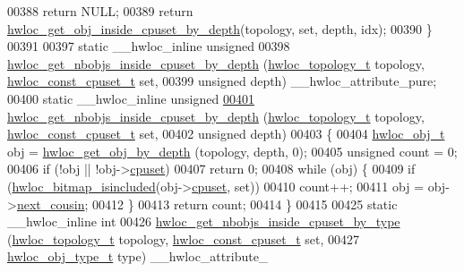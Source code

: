 \begin{DoxyCode}
00388     \textcolor{keywordflow}{return} NULL;
00389   \textcolor{keywordflow}{return} \hyperlink{a00054_ga57c8a0e227d1b16a31d19aaf755b42c0}{hwloc_get_obj_inside_cpuset_by_depth}(topology, \textcolor{keyword}{set}, depth, idx);
00390 \}
00391 
00397 \textcolor{keyword}{static} \_\_hwloc\_inline \textcolor{keywordtype}{unsigned}
00398 \hyperlink{a00054_ga457604a2dedbf70ba3b480558666b56b}{hwloc_get_nbobjs_inside_cpuset_by_depth} (\hyperlink{a00039_ga9d1e76ee15a7dee158b786c30b6a6e38}{hwloc_topology_t} topology, 
      \hyperlink{a00040_ga1f784433e9b606261f62d1134f6a3b25}{hwloc_const_cpuset_t} \textcolor{keyword}{set},
00399                                          \textcolor{keywordtype}{unsigned} depth) \_\_hwloc\_attribute\_pure;
00400 \textcolor{keyword}{static} \_\_hwloc\_inline \textcolor{keywordtype}{unsigned}
\hypertarget{a00031_source_l00401}{}\hyperlink{a00054_ga457604a2dedbf70ba3b480558666b56b}{00401} \hyperlink{a00054_ga457604a2dedbf70ba3b480558666b56b}{hwloc_get_nbobjs_inside_cpuset_by_depth} (\hyperlink{a00039_ga9d1e76ee15a7dee158b786c30b6a6e38}{hwloc_topology_t} topology, 
      \hyperlink{a00040_ga1f784433e9b606261f62d1134f6a3b25}{hwloc_const_cpuset_t} \textcolor{keyword}{set},
00402                                          \textcolor{keywordtype}{unsigned} depth)
00403 \{
00404   \hyperlink{a00016}{hwloc_obj_t} obj = \hyperlink{a00047_gaedd78240b0c1108355586a268ec5a697}{hwloc_get_obj_by_depth} (topology, depth, 0);
00405   \textcolor{keywordtype}{unsigned} count = 0;
00406   \textcolor{keywordflow}{if} (!obj || !obj->\hyperlink{a00016_a67925e0f2c47f50408fbdb9bddd0790f}{cpuset})
00407     \textcolor{keywordflow}{return} 0;
00408   \textcolor{keywordflow}{while} (obj) \{
00409     \textcolor{keywordflow}{if} (\hyperlink{a00065_gaae29e14a926c198e8f91e6e4790621e7}{hwloc_bitmap_isincluded}(obj->\hyperlink{a00016_a67925e0f2c47f50408fbdb9bddd0790f}{cpuset}, \textcolor{keyword}{set}))
00410       count++;
00411     obj = obj->\hyperlink{a00016_a85a788017457129589318b6c39451acf}{next_cousin};
00412   \}
00413   \textcolor{keywordflow}{return} count;
00414 \}
00415 
00425 \textcolor{keyword}{static} \_\_hwloc\_inline \textcolor{keywordtype}{int}
00426 \hyperlink{a00054_ga63481874c69ed257b1a0c03e7615ff97}{hwloc_get_nbobjs_inside_cpuset_by_type} (\hyperlink{a00039_ga9d1e76ee15a7dee158b786c30b6a6e38}{hwloc_topology_t} topology, 
      \hyperlink{a00040_ga1f784433e9b606261f62d1134f6a3b25}{hwloc_const_cpuset_t} \textcolor{keyword}{set},
00427                                         \hyperlink{a00041_gacd37bb612667dc437d66bfb175a8dc55}{hwloc_obj_type_t} type) \_\_hwloc\_attribute\_

\end{DoxyCode}
